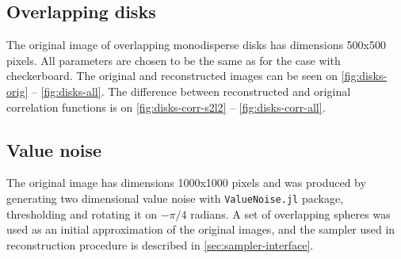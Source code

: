 \documentclass[preprint,amsmath,amssymb,aps,pre]{revtex4-1}
\begin{document}
\subsection{Overlapping disks}
The original image of overlapping monodisperse disks has dimensions 500x500
pixels. All parameters are chosen to be the same as for the case with
checkerboard. The original and reconstructed images can be seen on
\cref{fig:disks-orig} -- \cref{fig:disks-all}. The difference between
reconstructed and original correlation functions is on
\cref{fig:disks-corr-s2l2} -- \cref{fig:disks-corr-all}.

\subsection{Value noise}
The original image has dimensions 1000x1000 pixels and was produced by
generating two dimensional value noise with \verb+ValueNoise.jl+ package,
thresholding and rotating it on $-\pi/4$ radians. A set of overlapping spheres
was used as an initial approximation of the original images, and the sampler
used in reconstruction procedure is described in \cref{sec:sampler-interface}.
\end{document}
